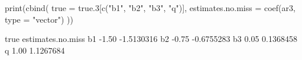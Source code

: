 \begin{Schunk}
\begin{Sinput}
 print(cbind(
   true = true.3[c("b1", "b2", "b3", "q")],
   estimates.no.miss = coef(ar3, type = "vector")
 ))
\end{Sinput}
\begin{Soutput}
    true estimates.no.miss
b1 -1.50        -1.5130316
b2 -0.75        -0.6755283
b3  0.05         0.1368458
q   1.00         1.1267684
\end{Soutput}
\end{Schunk}
